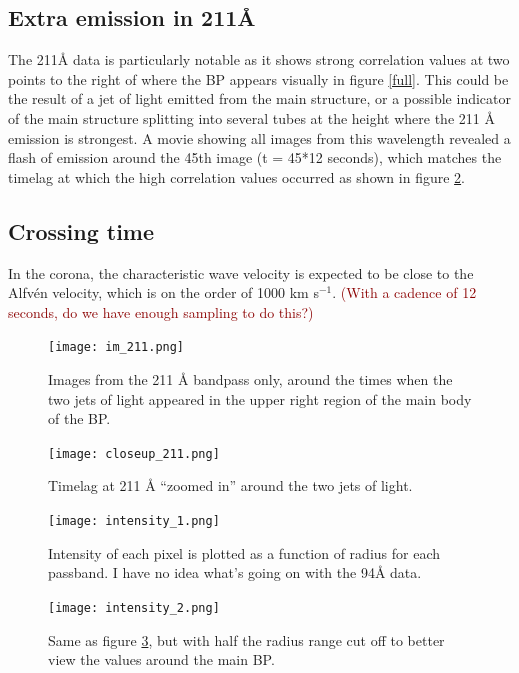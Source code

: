\documentclass[preprint]{aastex}   %
\begin{document}
\subsection{Extra emission in 211\AA{}}
The 211\AA{} data is particularly notable as it shows strong correlation values
at two points to the right of where the BP appears visually in figure \ref{full}.
This could be the result of a jet of light emitted from the main structure, or a
possible indicator of the main structure splitting into several tubes at the
height where the 211 \AA{} emission is strongest.
A movie showing all images from this wavelength
revealed a flash
of emission around the 45th image (t = 45*12 seconds),
which matches the timelag at which the high correlation values occurred as shown
in figure \ref{closeup}.

\subsection{Crossing time}
In the corona, the characteristic wave velocity is expected to be close to
the Alfv\'en velocity, which is on the order of 1000 km s$^{-1}$.
\textcolor{darkred}{(With a
cadence of 12 seconds, do we have enough sampling to do this?)}


\begin{figure}[htb!]
    \texttt{[image: im\_211.png]}
    \caption{Images from the 211 \AA{} bandpass only, around the times when the
        two jets of light appeared in the upper right region of the main body of the BP. }
    \label{211_images}
\end{figure}

\begin{figure}[htb!]
    \texttt{[image: closeup\_211.png]}
    \caption{Timelag at 211 \AA{} ``zoomed in'' around the two jets of light.}
    \label{closeup}
\end{figure}

\begin{figure}[htb!]
    \texttt{[image: intensity\_1.png]}
    \caption{Intensity of each pixel is plotted as a function of radius for each
        passband. I have no idea what's going on with the 94\AA{} data.}
    \label{intensity_1}
\end{figure}

\begin{figure}[htb!]
    \texttt{[image: intensity\_2.png]}
    \caption{Same as figure \ref{intensity_1}, but with half the radius range
        cut off to better view the values around the main BP.}
    \label{intensity_2}
\end{figure}
\end{document}
